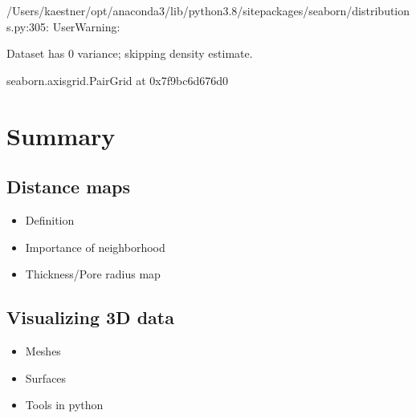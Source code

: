 \documentclass[letterpaper,10pt,english]{sphinxmanual}
\begin{document}
\begin{sphinxVerbatim}[commandchars=\\\{\}]
/Users/kaestner/opt/anaconda3/lib/python3.8/site\PYGZhy{}packages/seaborn/distributions.py:305: UserWarning:

Dataset has 0 variance; skipping density estimate.
\end{sphinxVerbatim}

\begin{sphinxVerbatim}[commandchars=\\\{\}]
\PYGZlt{}seaborn.axisgrid.PairGrid at 0x7f9bc6d676d0\PYGZgt{}
\end{sphinxVerbatim}

\noindent{}


\chapter{Summary}
\label{\detokenize{06-AdvancedShapeAndTexture:summary}}

\section{Distance maps}
\label{\detokenize{06-AdvancedShapeAndTexture:distance-maps}}\begin{itemize}
\item {} 
\sphinxAtStartPar
Definition

\item {} 
\sphinxAtStartPar
Importance of neighborhood

\item {} 
\sphinxAtStartPar
Thickness/Pore radius map

\end{itemize}


\section{Visualizing 3D data}
\label{\detokenize{06-AdvancedShapeAndTexture:visualizing-3d-data}}\begin{itemize}
\item {} 
\sphinxAtStartPar
Meshes

\item {} 
\sphinxAtStartPar
Surfaces

\item {} 
\sphinxAtStartPar
Tools in python

\end{itemize}
\end{document}
